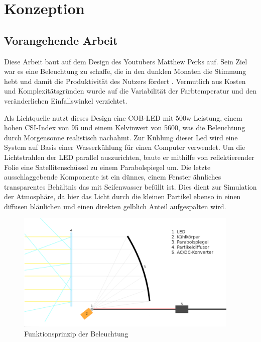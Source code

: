 \chapter{Konzeption}

\section{Vorangehende Arbeit}
Diese Arbeit baut auf dem Design des Youtubers \glqq Matthew Perks\grqq{} auf. Sein Ziel war es eine Beleuchtung zu schaffe, die in den dunklen Monaten die Stimmung hebt und damit die Produktivität des Nutzers fördert \cite{Perks20}. Vermutlich aus Kosten und Komplexitätsgründen wurde auf die Variabilität der Farbtemperatur und den veränderlichen Einfallswinkel verzichtet.

Als Lichtquelle nutzt dieses Design eine COB-LED mit 500w Leistung, einem hohen CSI-Index von 95 und einem Kelvinwert von 5600, was die Beleuchtung durch Morgensonne realistisch nachahmt. Zur Kühlung dieser Led wird eine System auf Basis einer Wasserkühlung für einen Computer verwendet. Um die Lichtstrahlen der LED parallel auszurichten, baute er mithilfe von reflektierender Folie eine Satellitenschüssel zu einem Parabolspiegel um. Die letzte ausschlaggebende Komponente ist ein dünnes, einem Fenster ähnliches transparentes Behältnis das mit Seifenwasser befüllt ist. Dies dient zur Simulation der Atmosphäre, da hier das Licht durch die kleinen Partikel ebenso in einen diffusen bläulichen und einen direkten gelblich Anteil aufgespalten wird.

\begin{figure}[H]
	\centering
	\includegraphics[width=0.95\textwidth]{resources/own_content/sun-design}
	\caption{Funktionsprinzip der Beleuchtung \cite{LePr}}
	\label{img:funktions_prinzip}
\end{figure}

